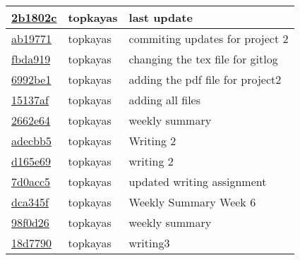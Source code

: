 \begin{tabular}{l l l}
\href{git@github.com:topkayas/CS444/commit/2b1802c27d1698a16d0af379c06764c9615671ca}{2b1802c} & topkayas & last update\\\hline
\href{git@github.com:topkayas/CS444/commit/ab19771e084bd55e0b12ca6d5240ca33f1461146}{ab19771} & topkayas & commiting updates for project 2\\\hline
\href{git@github.com:topkayas/CS444/commit/fbda9191ce05a70288b9e2e0a8051c9378b816e8}{fbda919} & topkayas & changing the tex file for gitlog\\\hline
\href{git@github.com:topkayas/CS444/commit/6992be1f03da6fd53a237575bfa8fb1c043b5573}{6992be1} & topkayas & adding the pdf file for project2\\\hline
\href{git@github.com:topkayas/CS444/commit/15137af14f0acb812f6fe318ffdccbde75031666}{15137af} & topkayas & adding all files\\\hline
\href{git@github.com:topkayas/CS444/commit/2662e64dd8122de433d0f40269de61bbea48e72b}{2662e64} & topkayas & weekly summary\\\hline
\href{git@github.com:topkayas/CS444/commit/adecbb5efda548209fc3647e1c52a88dc0742611}{adecbb5} & topkayas & Writing 2\\\hline
\href{git@github.com:topkayas/CS444/commit/d165e6966de9fd04819dc4eb0d80f4224c8651c1}{d165e69} & topkayas & writing 2\\\hline
\href{git@github.com:topkayas/CS444/commit/7d0acc5da23ae2b47345470b9b27deb82fda8417}{7d0acc5} & topkayas & updated writing assignment\\\hline
\href{git@github.com:topkayas/CS444/commit/dca345fee0806ec8d95aa547f45be92bd81a9a69}{dca345f} & topkayas & Weekly Summary Week 6\\\hline
\href{git@github.com:topkayas/CS444/commit/98f0d26a0b5a03aa64049cb3a89d52842c8fac31}{98f0d26} & topkayas & weekly summary\\\hline
\href{git@github.com:topkayas/CS444/commit/18d77900b9925ce8d83dc3f5a3664ee3b04db562}{18d7790} & topkayas & writing3\\\hline\end{tabular}
